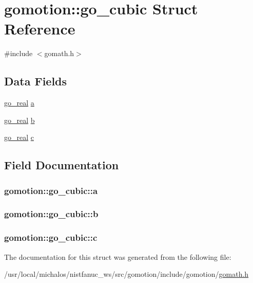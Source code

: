 \hypertarget{structgomotion_1_1go__cubic}{\section{gomotion\-:\-:go\-\_\-cubic Struct Reference}
\label{structgomotion_1_1go__cubic}
}


{\ttfamily \#include $<$gomath.\-h$>$}

\subsection*{Data Fields}
\begin{DoxyCompactItemize}
\item 
\hyperlink{gotypes_8h_afd666a2393eebd71ee455846ac9def9b}{go\-\_\-real} \hyperlink{structgomotion_1_1go__cubic_a4cef7eaf3f4f6f61163bdd85125a1e18}{a}
\item 
\hyperlink{gotypes_8h_afd666a2393eebd71ee455846ac9def9b}{go\-\_\-real} \hyperlink{structgomotion_1_1go__cubic_ab203c573d06324c0be197b1904b9d3b2}{b}
\item 
\hyperlink{gotypes_8h_afd666a2393eebd71ee455846ac9def9b}{go\-\_\-real} \hyperlink{structgomotion_1_1go__cubic_a058307b0dbddb6bd22ebe8a15c26d77a}{c}
\end{DoxyCompactItemize}


\subsection{Field Documentation}
\hypertarget{structgomotion_1_1go__cubic_a4cef7eaf3f4f6f61163bdd85125a1e18}{
\subsubsection[{a}]{ gomotion\-::go\-\_\-cubic\-::a}}\label{structgomotion_1_1go__cubic_a4cef7eaf3f4f6f61163bdd85125a1e18}
\hypertarget{structgomotion_1_1go__cubic_ab203c573d06324c0be197b1904b9d3b2}{
\subsubsection[{b}]{ gomotion\-::go\-\_\-cubic\-::b}}\label{structgomotion_1_1go__cubic_ab203c573d06324c0be197b1904b9d3b2}
\hypertarget{structgomotion_1_1go__cubic_a058307b0dbddb6bd22ebe8a15c26d77a}{
\subsubsection[{c}]{ gomotion\-::go\-\_\-cubic\-::c}}\label{structgomotion_1_1go__cubic_a058307b0dbddb6bd22ebe8a15c26d77a}


The documentation for this struct was generated from the following file\-:\begin{DoxyCompactItemize}
\item 
/usr/local/michalos/nistfanuc\-\_\-ws/src/gomotion/include/gomotion/\hyperlink{gomath_8h}{gomath.\-h}\end{DoxyCompactItemize}
